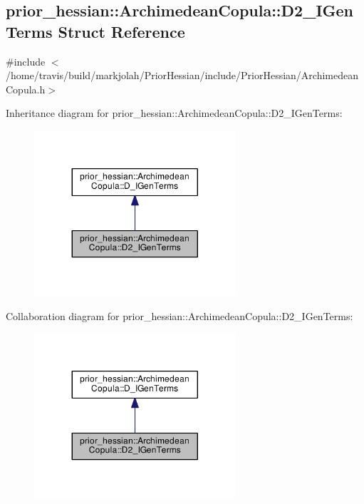 \hypertarget{structprior__hessian_1_1ArchimedeanCopula_1_1D2__IGenTerms}{}\subsection{prior\+\_\+hessian\+:\+:Archimedean\+Copula\+:\+:D2\+\_\+\+I\+Gen\+Terms Struct Reference}
\label{structprior__hessian_1_1ArchimedeanCopula_1_1D2__IGenTerms}


{\ttfamily \#include $<$/home/travis/build/markjolah/\+Prior\+Hessian/include/\+Prior\+Hessian/\+Archimedean\+Copula.\+h$>$}



Inheritance diagram for prior\+\_\+hessian\+:\+:Archimedean\+Copula\+:\+:D2\+\_\+\+I\+Gen\+Terms\+:\nopagebreak
\begin{figure}[H]
\begin{center}
\leavevmode
\includegraphics[width=212pt]{structprior__hessian_1_1ArchimedeanCopula_1_1D2__IGenTerms__inherit__graph}
\end{center}
\end{figure}


Collaboration diagram for prior\+\_\+hessian\+:\+:Archimedean\+Copula\+:\+:D2\+\_\+\+I\+Gen\+Terms\+:\nopagebreak
\begin{figure}[H]
\begin{center}
\leavevmode
\includegraphics[width=212pt]{structprior__hessian_1_1ArchimedeanCopula_1_1D2__IGenTerms__coll__graph}
\end{center}
\end{figure}
